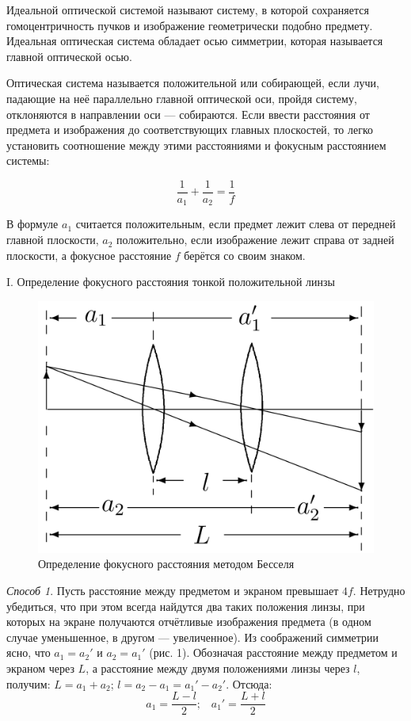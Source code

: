 \documentclass[a4paper,12pt]{article} %
\begin{document}
	Идеальной оптической системой называют систему, в которой сохраняется гомоцентричность пучков и изображение геометрически подобно предмету. Идеальная оптическая система обладает осью симметрии, которая называется главной оптической осью.
	
	Оптическая система называется положительной или собирающей, если лучи, падающие на неё параллельно главной оптической оси, пройдя систему, отклоняются в направлении оси — собираются. Если ввести расстояния от предмета и изображения до соответствующих главных плоскостей, то легко установить соотношение между этими расстояниями и фокусным расстоянием системы:
	
	\begin{equation*}
		\frac{1}{a_1} + \frac{1}{a_2} = \frac{1}{f}
	\end{equation*}

	В формуле $a_1$ считается положительным, если предмет лежит слева от передней главной плоскости, $a_2$ положительно, если изображение лежит справа от задней плоскости, а фокусное расстояние $f$ берётся со своим знаком.
	
	\newpage
	\begin{center}
		I. Определение фокусного расстояния тонкой положительной линзы
	\end{center}
	
	\begin{figure}[h!]
		\centering
		\includegraphics[scale=0.6]{Pictures/Бессель}
		\caption{Определение фокусного расстояния методом Бесселя}
	\end{figure}

	\textit{Способ 1}. Пусть расстояние между предметом и экраном превышает $4f$. Нетрудно убедиться, что при этом всегда найдутся два таких положения линзы, при которых на экране получаются отчётливые изображения предмета (в одном случае уменьшенное, в другом — увеличенное). Из соображений симметрии ясно, что $a_1 = a_2'$ и $a_2 = a_1'$ (рис. 1). Обозначая расстояние между предметом и экраном через $L$, а расстояние между двумя положениями линзы через $l$, получим: $L = a_1 + a_2$; $l = a_2 - a_1 = a_1' - a_2'$. Отсюда:
	\begin{equation*}
		a_1 = \frac{L - l}{2}; \;\;\; a_1' = \frac{L+l}{2}
	\end{equation*}
	
\end{document}
